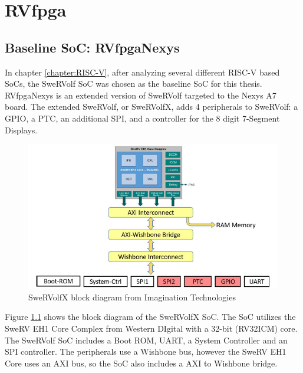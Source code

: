 \chapter{RVfpga}
\label{chapter:rvfpga}
\section{Baseline SoC: RVfpgaNexys}
In chapter \ref{chapter:RISC-V}, after analyzing several different RISC-V based SoCs, the SweRVolf SoC was chosen as the baseline SoC for this thesis. RVfpgaNexys \cite{} is an extended version of SweRVolf targeted to the Nexys A7 board. The extended SweRVolf, or SweRVolfX, adds 4 peripherals to SweRVolf: a GPIO, a PTC, an additional SPI, and a controller for the 8 digit 7-Segment Displays.

\begin{figure}[h]
    \centering
    \includegraphics[scale=0.7]{Figures/SweRVolfX.png}
    \caption{SweRVolfX block diagram from Imagination Technologies}
    \label{fig:SweRVolfX}
\end{figure}

Figure \ref{fig:SweRVolfX} shows the block diagram of the SweRVolfX SoC. The SoC utilizes the SweRV EH1 Core Complex from Western DIgital with a 32-bit (RV32ICM) core. The SweRVolf SoC includes a Boot ROM, UART, a System Controller and an SPI controller. The peripherals use a Wishbone bus, however the SweRV EH1 Core uses an AXI bus, so the SoC also includes a AXI to Wishbone bridge.

